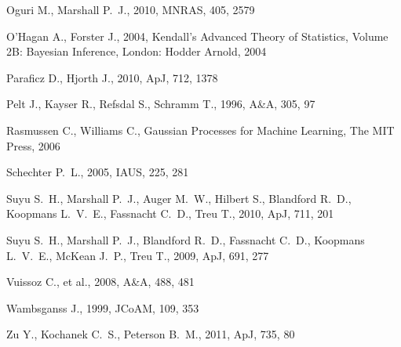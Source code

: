 \documentclass[useAMS,usenatbib, a4paper]{mn2e} \usepackage{natbib}
\begin{document}
\begin{thebibliography}{99}
 Oguri M., Marshall P.~J., 2010, MNRAS, 405, 2579 

 O'Hagan A., Forster J., 2004, Kendall's Advanced Theory of Statistics, Volume 2B: Bayesian Inference, London: Hodder Arnold, 2004

 Paraficz D., Hjorth J., 2010, ApJ, 712, 1378 

 Pelt J., Kayser R., Refsdal S., Schramm T., 1996, A\&A, 305, 97 

 Rasmussen C., Williams C., Gaussian Processes for Machine Learning, The MIT Press, 2006

Schechter P.~L., 2005, IAUS, 225, 281 

Suyu S.~H., Marshall P.~J., Auger M.~W., Hilbert S., Blandford R.~D., 
Koopmans L.~V.~E., Fassnacht C.~D., Treu T., 2010, ApJ, 711, 201 

Suyu S.~H., Marshall P.~J., Blandford R.~D., Fassnacht C.~D., Koopmans 
L.~V.~E., McKean J.~P., Treu T., 2009, ApJ, 691, 277 

 Vuissoz C., et al., 2008, A\&A, 488, 481 

Wambsganss J., 1999, JCoAM, 109, 353 

 Zu Y., Kochanek C.~S., Peterson B.~M., 2011, ApJ, 735, 80 
\end{thebibliography}
\end{document}
